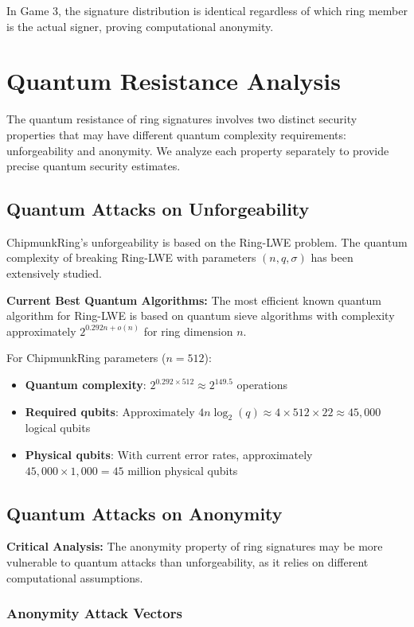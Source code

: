 \documentclass[11pt,a4paper]{article}
\begin{document}
In Game 3, the signature distribution is identical regardless of which ring member is the actual signer, proving computational anonymity.

\section{Quantum Resistance Analysis}

The quantum resistance of ring signatures involves two distinct security properties that may have different quantum complexity requirements: unforgeability and anonymity. We analyze each property separately to provide precise quantum security estimates.

\subsection{Quantum Attacks on Unforgeability}

ChipmunkRing's unforgeability is based on the Ring-LWE problem. The quantum complexity of breaking Ring-LWE with parameters $(n, q, \sigma)$ has been extensively studied.

\textbf{Current Best Quantum Algorithms:} The most efficient known quantum algorithm for Ring-LWE is based on quantum sieve algorithms with complexity approximately $2^{0.292n + o(n)}$ for ring dimension $n$.

For ChipmunkRing parameters ($n = 512$):
\begin{itemize}
\item \textbf{Quantum complexity}: $2^{0.292 \times 512} \approx 2^{149.5}$ operations
\item \textbf{Required qubits}: Approximately $4n \log_2(q) \approx 4 \times 512 \times 22 \approx 45,000$ logical qubits
\item \textbf{Physical qubits}: With current error rates, approximately $45,000 \times 1,000 = 45$ million physical qubits
\end{itemize}

\subsection{Quantum Attacks on Anonymity}

\textbf{Critical Analysis:} The anonymity property of ring signatures may be more vulnerable to quantum attacks than unforgeability, as it relies on different computational assumptions.

\subsubsection{Anonymity Attack Vectors}
\end{document}

